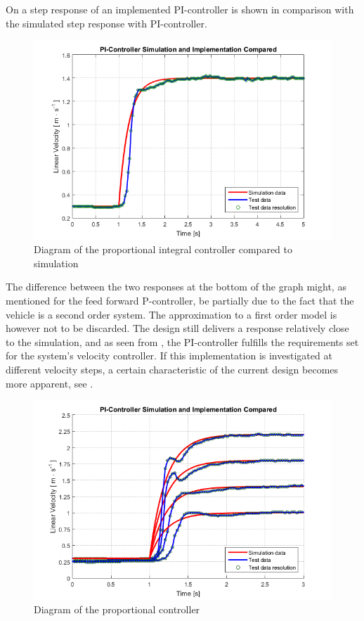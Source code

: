 On  a step response of an implemented PI-controller is shown in comparison with the simulated step response with PI-controller.
%
\begin{figure}[H]
 	\centering
 	\includegraphics[width=\textwidth]{figures/PIcontrollerStepRealVsSim}
 	\caption{Diagram of the proportional integral controller compared to simulation}
 	\label{fig:PIcontrollerStepRealVsSim}
\end{figure}
%
The difference between the two responses at the bottom of the graph might, as mentioned for the feed forward P-controller, be partially due to the fact that the vehicle is a second order system. The approximation to a first order model is however not to be discarded. The design still delivers a response relatively close to the simulation, and as seen from , the PI-controller fulfills the requirements set for the system's velocity controller.
If this implementation is investigated at different velocity steps, a certain characteristic of the current design becomes more apparent, see .
%
\begin{figure}[H]
 	\centering
 	\includegraphics[width=\textwidth]{figures/multiStepPI}
 	\caption{Diagram of the proportional controller}
 	\label{fig:multiStepPI}
\end{figure}

